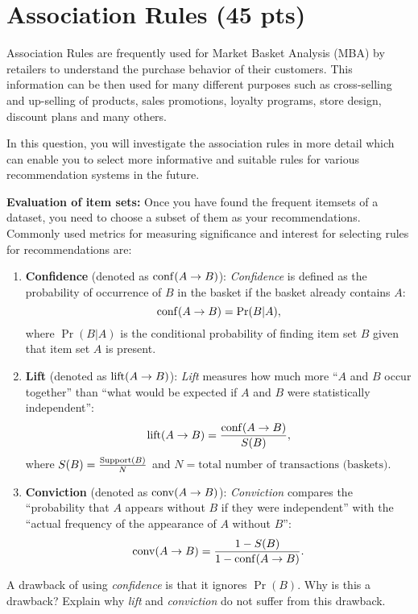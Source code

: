 \section{Association Rules (45 pts)}

Association Rules are frequently used for Market Basket Analysis (MBA) by retailers to understand the purchase behavior of their customers.  This information can be then used for many different purposes such as cross-selling and up-selling of products, sales promotions, loyalty programs, store design, discount plans and many others. 

In this question, you will investigate the association rules in more detail which can enable you to select more informative and suitable rules for various recommendation systems in the future.

\textbf{Evaluation of item sets:} Once you have found the frequent itemsets of a dataset, you need to choose a subset of them as your recommendations. Commonly used metrics for measuring significance and interest for selecting rules for recommendations are:

\begin{enumerate}
\item \textbf{Confidence} (denoted as $\operatorname{conf}(A \rightarrow B)$): 
\emph{Confidence} is defined as the probability of occurrence of $B$ in the basket if the basket already contains $A$:
\[
	\operatorname{conf}(A \rightarrow B) = \Pr(B|A),
\]
where $\Pr(B|A)$ is the conditional probability of finding item set $B$ given that item set $A$ is present. 

\item \textbf{Lift} (denoted as $\operatorname{lift}(A \rightarrow B)$):
\emph{Lift} measures how much more ``$A$ and $B$ occur together'' than ``what would be expected if $A$ and $B$ were statistically independent'':
\[
	\operatorname{lift}(A \rightarrow B) = \frac{\operatorname{conf}(A \rightarrow B)}{S(B)},
\]
where $S(B) = \frac{\operatorname{Support}(B)}{N}$ and $N=\text{total number of transactions (baskets)}$.

\item \textbf{Conviction} (denoted as $\operatorname{conv}(A \rightarrow B)$): 
\emph{Conviction} compares the ``probability that $A$ appears without $B$ if they were independent'' with the ``actual frequency of the appearance of $A$ without $B$'':
\[
	\operatorname{conv}(A \rightarrow B) = \frac{1-S(B)}{1-\operatorname{conf}(A \rightarrow B)}.
\]
\end{enumerate}

A drawback of using \textit{confidence} is that it ignores $\Pr(B)$. Why is this a drawback? Explain why \textit{lift} and \textit{conviction} do not suffer from this drawback.

